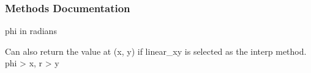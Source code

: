 \documentclass[letterpaper,10pt,english]{sphinxmanual}
\begin{document}
\begin{fulllineitems}
\begin{fulllineitems}
\label{\detokenize{api/MARIGOLD.Condition:MARIGOLD.Condition.debugFID}}
\pysigstartsignatures
{}
\pysigstopsignatures
\end{fulllineitems}

\subsubsection*{Methods Documentation}

\begin{fulllineitems}
\label{\detokenize{api/MARIGOLD.Condition:MARIGOLD.Condition.TD_FR_ID}}
\pysigstartsignatures
{}
\pysigstopsignatures
\end{fulllineitems}


\begin{fulllineitems}
\label{\detokenize{api/MARIGOLD.Condition:MARIGOLD.Condition.__call__}}
\pysigstartsignatures
{}
\pysigstopsignatures\begin{description}
\sphinxAtStartPar
phi in radians

\sphinxAtStartPar
Can also return the value at (x, y) if linear\_xy is selected as the interp method. phi \sphinxhyphen{}\textgreater{} x, r \sphinxhyphen{}\textgreater{} y

\end{description}

\end{fulllineitems}


\end{fulllineitems}
\end{document}
